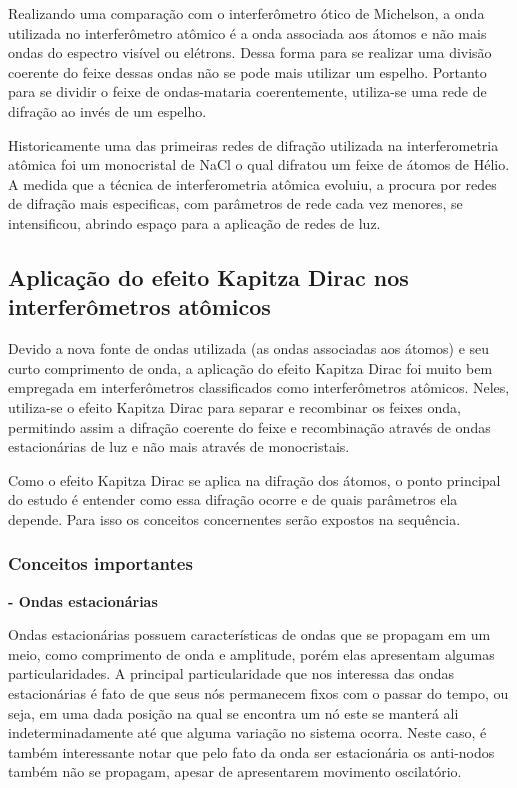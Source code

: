 	\par Realizando uma comparação com o interferômetro ótico de Michelson, a onda utilizada no interferômetro atômico é a onda associada aos átomos e não mais ondas do espectro visível ou elétrons. Dessa forma para se realizar uma divisão coerente do feixe dessas ondas não se pode mais utilizar um espelho. Portanto para se dividir o feixe de ondas-mataria coerentemente, utiliza-se uma rede de difração ao invés de um espelho\cite{ricardo_5}.
	
	\par Historicamente uma das primeiras redes de difração utilizada na interferometria atômica foi um monocristal de NaCl  o qual difratou um feixe de átomos de Hélio\cite{ricardo_2}. A medida que a técnica de interferometria atômica evoluiu, a procura por redes de difração mais especificas, com parâmetros de rede cada vez menores, se intensificou, abrindo espaço para a aplicação de redes de luz.

\subsection{Aplicação do efeito Kapitza Dirac nos interferômetros atômicos}

	\par Devido a nova fonte de ondas utilizada (as ondas associadas aos átomos) e seu curto comprimento de onda, a aplicação do efeito Kapitza Dirac foi muito bem empregada em interferômetros classificados como interferômetros atômicos. Neles, utiliza-se o efeito Kapitza Dirac para separar e recombinar os feixes onda, permitindo assim a difração coerente do feixe e recombinação através de ondas estacionárias de luz e não mais através de monocristais\cite{ricardo_2}.

	\par Como o efeito Kapitza Dirac se aplica na difração dos átomos, o ponto principal do estudo é entender como essa difração ocorre e de quais parâmetros ela depende. Para isso os conceitos concernentes serão expostos na sequência.

	\subsubsection{Conceitos importantes}

		\textbf{- Ondas estacionárias}

		\par Ondas estacionárias possuem características de ondas que se propagam em um meio, como comprimento de onda e amplitude, porém elas apresentam algumas particularidades. A principal particularidade que nos interessa das ondas estacionárias é fato de que seus nós permanecem fixos com o passar do tempo, ou seja, em uma dada posição na qual se encontra um nó este se manterá ali indeterminadamente até que alguma variação no sistema ocorra. Neste caso, é também interessante notar que pelo fato da onda ser estacionária os anti-nodos também não se propagam, apesar de apresentarem movimento oscilatório.
	
